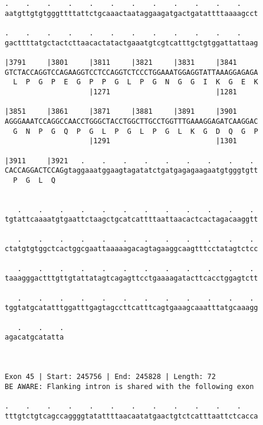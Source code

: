 \documentclass{article}
\begin{document}
\begin{Verbatim}
.    .    .    .    .    .    .    .    .    .    .    .    
aatgttgtgtgggttttattctgcaaactaataggaagatgactgatattttaaaagcct
                                                            
.    .    .    .    .    .    .    .    .    .    .    .    
gacttttatgctactcttaacactatactgaaatgtcgtcatttgctgtggattattaag
                                                            
|3791     |3801     |3811     |3821     |3831     |3841     
GTCTACCAGGTCCAGAAGGTCCTCCAGGTCTCCCTGGAAATGGAGGTATTAAAGGAGAGA
  L  P  G  P  E  G  P  P  G  L  P  G  N  G  G  I  K  G  E  K
                    |1271                         |1281     
  
|3851     |3861     |3871     |3881     |3891     |3901     
AGGGAAATCCAGGCCAACCTGGGCTACCTGGCTTGCCTGGTTTGAAAGGAGATCAAGGAC
  G  N  P  G  Q  P  G  L  P  G  L  P  G  L  K  G  D  Q  G  P
                    |1291                         |1301     
  
|3911     |3921   .    .    .    .    .    .    .    .    . 
CACCAGGACTCCAGgtaggaaatggaagtagatatctgatgagagaagaatgtgggtgtt
  P  G  L  Q                                                
                                                            
  
   .    .    .    .    .    .    .    .    .    .    .    . 
tgtattcaaaatgtgaattctaagctgcatcattttaattaacactcactagacaaggtt
                                                            
   .    .    .    .    .    .    .    .    .    .    .    . 
ctatgtgtggctcactggcgaattaaaaagacagtagaaggcaagtttcctatagtctcc
                                                            
   .    .    .    .    .    .    .    .    .    .    .    . 
taaagggactttgttgtattatagtcagagttcctgaaaagatacttcacctggagtctt
                                                            
   .    .    .    .    .    .    .    .    .    .    .    . 
tggtatgcatatttggatttgagtagccttcatttcagtgaaagcaaatttatgcaaagg
                                                            
   .    .    .
agacatgcatatta
              
              
 
Exon 45 | Start: 245756 | End: 245828 | Length: 72
BE AWARE: Flanking intron is shared with the following exon
 
.    .    .    .    .    .    .    .    .    .    .    .    
tttgtctgtcagccaggggtatattttaacaatatgaactgtctcatttaattctcacca
                                                            

\end{Verbatim}
\end{document}
